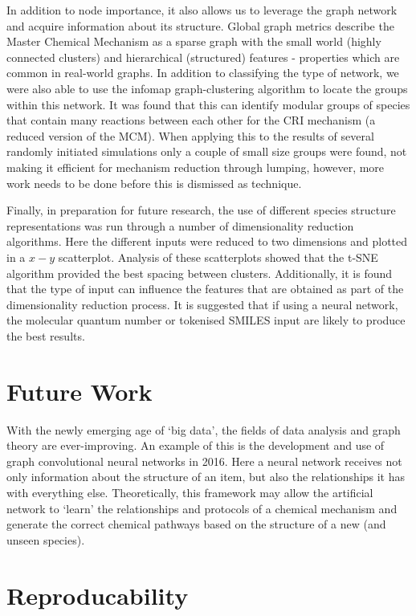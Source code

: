 In addition to node importance, it also allows us to leverage the graph network and acquire information about its structure. Global graph metrics describe the Master Chemical Mechanism as a sparse graph with the small world (highly connected clusters) and hierarchical (structured) features - properties which are common in real-world graphs. In addition to classifying the type of network, we were also able to use the infomap graph-clustering algorithm to locate the groups within this network. It was found that this can identify modular groups of species that contain many reactions between each other for the CRI mechanism (a reduced version of the MCM). When applying this to the results of several randomly initiated simulations only a couple of small size groups were found, not making it efficient for mechanism reduction through lumping, however, more work needs to be done before this is dismissed as technique.

Finally, in preparation for future research, the use of different species structure representations was run through a number of dimensionality reduction algorithms. Here the different inputs were reduced to two dimensions and plotted in a $x-y$ scatterplot. Analysis of these scatterplots showed that the t-SNE algorithm provided the best spacing between clusters. Additionally, it is found that the type of input can influence the features that are obtained as part of the dimensionality reduction process. It is suggested that if using a neural network, the molecular quantum number or tokenised SMILES input are likely to produce the best results.

\section{Future Work}
With the newly emerging age of `big data', the fields of data analysis and graph theory are ever-improving. An example of this is the development and use of graph convolutional neural networks in 2016. Here a neural network receives not only information about the structure of an item, but also the relationships it has with everything else. Theoretically, this framework may allow the artificial network to `learn' the relationships and protocols of a chemical mechanism and generate the correct chemical pathways based on the structure of a new (and unseen species).

\newpage

\section*{Reproducability}
%

